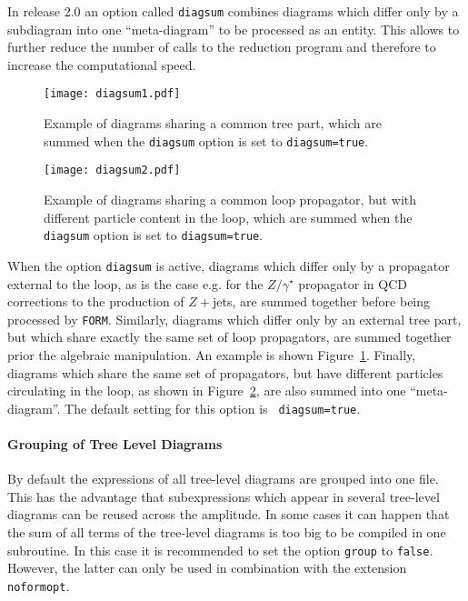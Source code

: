 \documentclass[11pt,a4paper]{refrep}
\newcommand{\form}{{\tt FORM}\xspace}
\begin{document}
In release 2.0 an option called {\tt diagsum} combines diagrams
which differ only by a subdiagram into one ``meta-diagram'' to be
processed as an entity. This allows to further reduce the number of
calls to the reduction program and therefore to increase the
computational speed. 

\begin{figure}[htb]
\centering
\texttt{[image: diagsum1.pdf]}
\caption{Example of diagrams sharing a common tree part, which are 
summed when the {\tt diagsum} option is set to {\tt diagsum=true}.}
\label{fig:diagsum_tree}
\end{figure} 

\begin{figure}[htb]
\centering
\texttt{[image: diagsum2.pdf]}
\caption{Example of diagrams sharing a common loop propagator, 
but with different particle content in the loop, which are summed when
the {\tt diagsum} option is set to {\tt diagsum=true}.}
\label{fig:diagsum_particle}
\end{figure} 


When the option {\tt diagsum} is active, diagrams which differ only by
a propagator external to the loop, as is the case e.g. for the
$Z/\gamma^\star$ propagator in QCD corrections to the production of
$Z+$jets, are summed together before being processed
by \form{}. Similarly, diagrams which differ only by an external tree
part, but which share exactly the same set of loop propagators, are
summed together prior the algebraic manipulation. An example is shown
Figure~\ref{fig:diagsum_tree}. Finally, diagrams which share the same
set of propagators, but have different particles circulating in the
loop, as shown in Figure~\ref{fig:diagsum_particle}, are also summed
into one ``meta-diagram''. The default setting for this option is {\tt
diagsum=true}.


\paragraph{Grouping of Tree Level Diagrams}

By default the expressions of all tree-level diagrams are grouped into one
file. This has the advantage that subexpressions which appear in several
tree-level diagrams can be reused across the amplitude. In some cases
it can happen that the sum of all terms of the tree-level diagrams is too big
to be compiled in one subroutine. In this case it is recommended to set
the option \texttt{group} to \texttt{false}. 
However, the latter can only be used in combination with the extension {\tt noformopt}.
\end{document}

